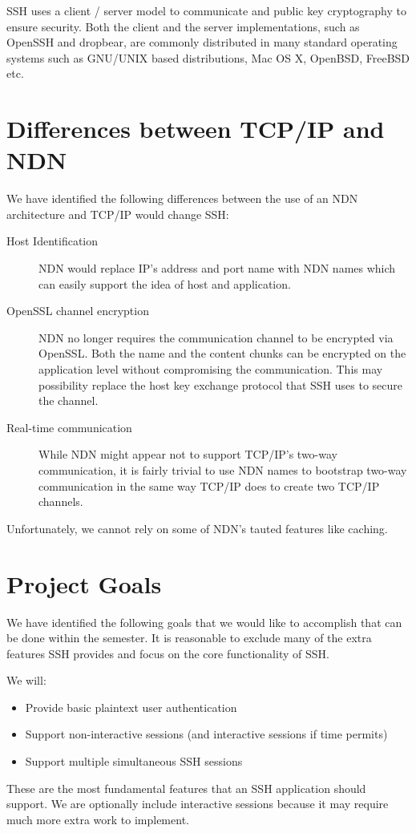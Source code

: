 \documentclass{acm_proc_article-sp}
\begin{document}
SSH uses a client / server model to communicate and public key cryptography to ensure security. Both the client and the server implementations, such as OpenSSH and dropbear, are commonly distributed in many standard operating systems such as GNU/UNIX based distributions, Mac OS X, OpenBSD, FreeBSD etc. 

\section{Differences between TCP/IP and NDN}

We have identified the following differences between the use of an NDN architecture and TCP/IP would change SSH:
\begin{description}
    \item[Host Identification] 
    NDN would replace IP’s address and port name with NDN names which can easily support the idea of host and application.

    \item[OpenSSL channel encryption] 
    NDN no longer requires the communication channel to be encrypted via OpenSSL. Both the name and the content chunks can be encrypted on the application level without compromising the communication. This may possibility replace the host key exchange protocol that SSH uses to secure the channel.

    \item[Real-time communication] 
    While NDN might appear not to support TCP/IP’s two-way communication, it is fairly trivial to use NDN names to bootstrap two-way communication in the same way TCP/IP does to create two TCP/IP channels.
\end{description}

Unfortunately, we cannot rely on some of NDN’s tauted features like caching.

\section{Project Goals}

We have identified the following goals that we would like to accomplish that can be done within the semester. It is reasonable to exclude many of the extra features SSH provides and focus on the core functionality of SSH.

We will:
\begin{itemize}
    \item Provide basic plaintext user authentication
    \item Support non-interactive sessions (and interactive sessions if time permits)
    \item Support multiple simultaneous SSH sessions
\end{itemize}
These are the most fundamental features that an SSH application should support. We are optionally include interactive sessions because it may require much more extra work to implement.
\end{document}
